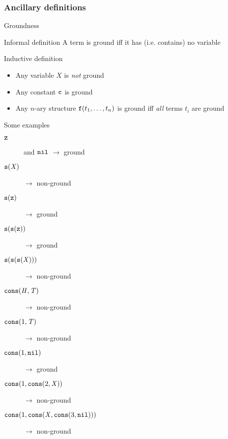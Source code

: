 \documentclass[presentation]{beamer}\mode<presentation>{\usetheme{AMSBolognaFC}}
\begin{document}
\subsubsection{Ancillary definitions}

\begin{frame}[allowframebreaks]{Groundness}
    \begin{block}{Informal definition}\centering
        A term is \alert{ground} iff it has (i.e. contains) no variable
    \end{block}

    \begin{alertblock}{Inductive definition}
        \begin{itemize}
            \item Any variable $X$ is \emph{not} ground
            \item Any constant $\mathtt{c}$ is ground
            \item Any $n$-ary structure $\mathtt{f}(t_1, \ldots, t_n)$ is ground iff \emph{all} terms $t_i$ are ground
        \end{itemize}
    \end{alertblock}

    \begin{exampleblock}{Some examples}
        \begin{description}
            \item[$\mathtt{z}$] and \alert{$\mathtt{nil}$} $\rightarrow$ ground
            \item[$\mathtt{s}(\mathit{X})$] $\rightarrow$ non-ground
            \item[$\mathtt{s}(\mathtt{z})$] $\rightarrow$ ground
            \item[$\mathtt{s}(\mathtt{s}(\mathtt{z}))$] $\rightarrow$ ground
            \item[$\mathtt{s}(\mathtt{s}(\mathtt{s}(\mathit{X})))$] $\rightarrow$ non-ground
            \item[$\mathtt{cons}(\mathit{H}, \mathit{T})$] $\rightarrow$ non-ground
            \item[$\mathtt{cons}(1, \mathit{T})$] $\rightarrow$ non-ground
            \item[$\mathtt{cons}(1, \mathtt{nil})$] $\rightarrow$ ground
            \item[$\mathtt{cons}(1, \mathtt{cons}(2, \mathit{X}))$] $\rightarrow$ non-ground
            \item[$\mathtt{cons}(1, \mathtt{cons}(\mathit{X}, \mathtt{cons}(3, \mathtt{nil})))$] $\rightarrow$ non-ground
        \end{description}
    \end{exampleblock}
\end{frame}
\end{document}
